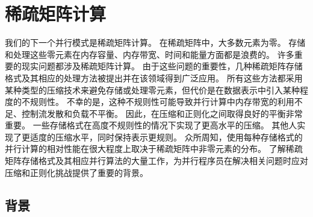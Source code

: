 \section{稀疏矩阵计算}
我们的下一个并行模式是稀疏矩阵计算。 在稀疏矩阵中，大多数元素为零。 存储和处理这些零元素在内存容量、内存带宽、时间和能量方面都是浪费的。 许多重要的现实问题都涉及稀疏矩阵计算。 由于这些问题的重要性，几种稀疏矩阵存储格式及其相应的处理方法被提出并在该领域得到广泛应用。 所有这些方法都采用某种类型的压缩技术来避免存储或处理零元素，但代价是在数据表示中引入某种程度的不规则性。 不幸的是，这种不规则性可能导致并行计算中内存带宽的利用不足、控制流发散和负载不平衡。 因此，在压缩和正则化之间取得良好的平衡非常重要。 一些存储格式在高度不规则性的情况下实现了更高水平的压缩。 其他人实现了更适度的压缩水平，同时保持表示更规则。 众所周知，使用每种存储格式的并行计算的相对性能在很大程度上取决于稀疏矩阵中非零元素的分布。 了解稀疏矩阵存储格式及其相应并行算法的大量工作，为并行程序员在解决相关问题时应对压缩和正则化挑战提供了重要的背景。

\subsection{背景}